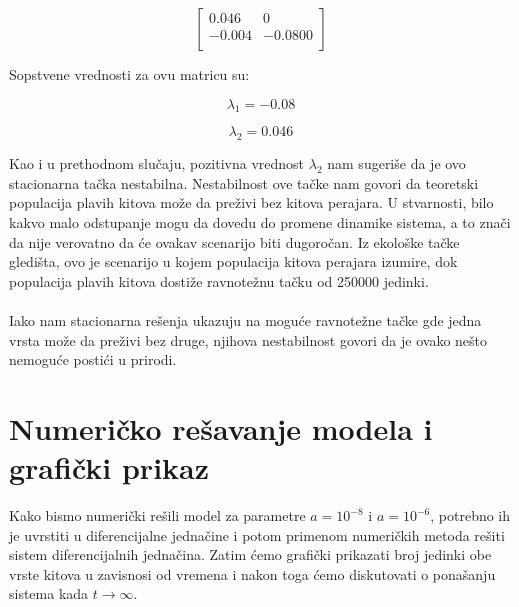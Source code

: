 \documentclass[a4paper]{article}
\begin{document}
{	
	\[
		\begin{bmatrix}
			0.046  &   0  \\
			-0.004 & -0.0800 \\
		\end{bmatrix} 
	\]	
	
	\newpage
	
	Sopstvene vrednosti za ovu matricu su:
	
	\[
		\lambda_1 = -0.08
	\]
	
	\[
		\lambda_2 = 0.046
	\]
	
	Kao i u prethodnom slučaju, pozitivna vrednost $\lambda_2$ nam sugeriše da je ovo stacionarna tačka nestabilna. Nestabilnost ove tačke nam govori da teoretski populacija plavih kitova može da preživi bez kitova perajara. U stvarnosti, bilo kakvo malo odstupanje mogu da dovedu do promene dinamike sistema, a to znači da nije verovatno da će ovakav scenarijo biti dugoročan. Iz ekološke tačke gledišta, ovo je scenarijo u kojem populacija kitova perajara izumire, dok populacija plavih kitova dostiže ravnotežnu tačku od 250000 jedinki.\\
	\\
	
	Iako nam stacionarna rešenja ukazuju na moguće ravnotežne tačke gde jedna vrsta može da preživi bez druge, njihova nestabilnost govori da je ovako nešto nemoguće postići u prirodi. 
		
	\section{Numeričko rešavanje modela i grafički prikaz}
	\label{sec:nrmgp}	
	
	
	Kako bismo numerički rešili model za parametre $a = 10^{-8}$ i $a = 10^{-6}$, potrebno ih je uvrstiti u diferencijalne jednačine i potom primenom numeričkih metoda rešiti sistem diferencijalnih jednačina. Zatim ćemo grafički prikazati broj jedinki obe vrste kitova u zavisnosi od vremena i nakon toga ćemo diskutovati o ponašanju sistema kada $t \to \infty$.  
	
}
\end{document}
